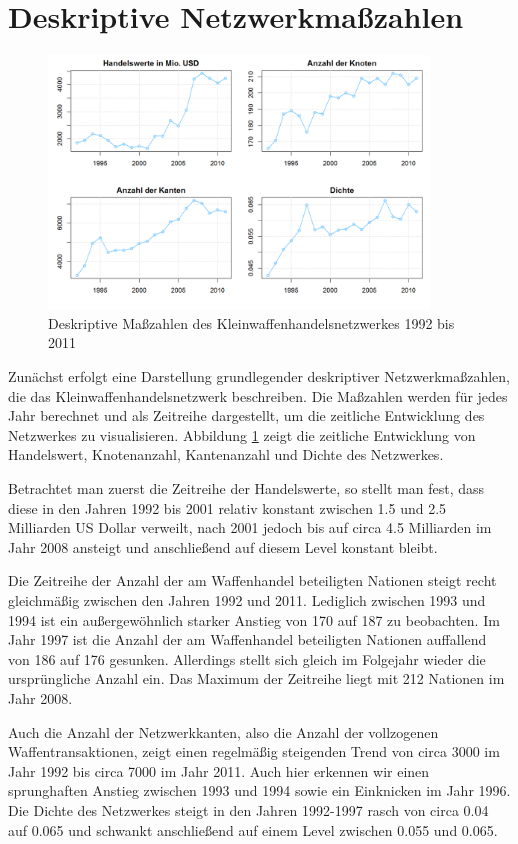\documentclass[a4paper,ngerman,oneside,titlepage,bibliography=totoc,11pt]{scrreprt}
\begin{document}
\section{Deskriptive Netzwerkmaßzahlen}
\begin{figure}[ht]
	\centering
		\includegraphics[width=0.9\textwidth]{Grafiken/ts_descriptives.png}
	\caption{Deskriptive Maßzahlen des Kleinwaffenhandelsnetzwerkes 1992 bis 2011}
	\label{fig:ts_descriptives}
\end{figure}
Zunächst erfolgt eine Darstellung grundlegender deskriptiver Netzwerkmaßzahlen, die das Kleinwaffenhandelsnetzwerk beschreiben. Die Maßzahlen werden für jedes Jahr berechnet und als Zeitreihe dargestellt, um die zeitliche Entwicklung des Netzwerkes zu visualisieren. Abbildung \ref{fig:ts_descriptives} zeigt die zeitliche Entwicklung von Handelswert, Knotenanzahl, Kantenanzahl und Dichte des Netzwerkes.

Betrachtet man zuerst die Zeitreihe der Handelswerte, so stellt man fest, dass diese in den Jahren 1992 bis 2001 relativ konstant zwischen 1.5 und 2.5 Milliarden US Dollar verweilt, nach 2001 jedoch bis auf circa 4.5 Milliarden im Jahr 2008 ansteigt und anschließend auf diesem Level konstant bleibt.

Die Zeitreihe der Anzahl der am Waffenhandel beteiligten Nationen steigt recht gleichmäßig zwischen den Jahren 1992 und 2011. Lediglich zwischen 1993 und 1994 ist ein außergewöhnlich starker Anstieg von 170 auf 187 zu beobachten. Im Jahr 1997 ist die Anzahl der am Waffenhandel beteiligten Nationen auffallend von 186 auf 176 gesunken. Allerdings stellt sich gleich im Folgejahr wieder die ursprüngliche Anzahl ein. Das Maximum der Zeitreihe liegt mit 212 Nationen im Jahr 2008.

Auch die Anzahl der Netzwerkkanten, also die Anzahl der vollzogenen Waffentransaktionen, zeigt einen regelmäßig steigenden Trend von circa 3000 im Jahr 1992 bis circa 7000 im Jahr 2011. Auch hier erkennen wir einen sprunghaften Anstieg zwischen 1993 und 1994 sowie ein Einknicken im Jahr 1996.
Die Dichte des Netzwerkes steigt in den Jahren 1992-1997 rasch von circa 0.04 auf 0.065 und schwankt  anschließend auf einem Level zwischen 0.055 und 0.065.
\end{document}
